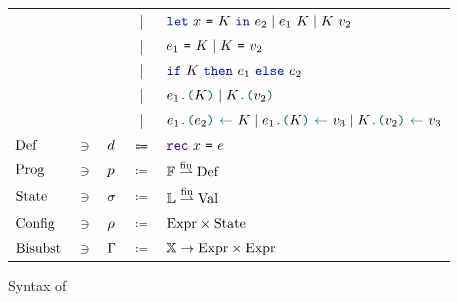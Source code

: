 \begin{figure}[tp]
\begin{tabular}{lclcl}
            &&
            & | &
            $\datalangLet{\datalangVar}{\datalangEctx}{\datalangExpr_2} \mid \datalangCall{\datalangExpr_1}{\datalangEctx} \mid \datalangCall{\datalangEctx}{\datalangVal_2}$
        \\
            &&
            & | &
            $\datalangEq{\datalangExpr_1}{\datalangEctx} \mid \datalangEq{\datalangEctx}{\datalangVal_2}$
        \\
            &&
            & | &
            $\datalangIf{\datalangEctx}{\datalangExpr_1}{\datalangExpr_2}$
        \\
            &&
            & | &
            $\datalangLoad{\datalangExpr_1}{\datalangEctx} \mid \datalangLoad{\datalangEctx}{\datalangVal_2}$
        \\
            &&
            & | &
            $\datalangStore{\datalangExpr_1}{\datalangExpr_2}{K} \mid \datalangStore{\datalangExpr_1}{\datalangEctx}{\datalangVal_3} \mid \datalangStore{\datalangEctx}{\datalangVal_2}{\datalangVal_3}$
        \\
            $\datalangDef[]$
            & $\ni$ &
            $\datalangDef$
            & $\Coloneqq$ &
            $\datalangRec{\datalangVar}{\datalangExpr}$
        \\
            $\datalangProg[]$
            & $\ni$ &
            $\datalangProg$
            & $\coloneqq$ &
            $\datalangFn[] \finmap \datalangDef[]$
        \\
            $\datalangState[]$
            & $\ni$ &
            $\datalangState$    
            & $\coloneqq$ &
            $\datalangLoc[] \finmap \datalangVal[]$
        \\
            $\datalangConfig[]$
            & $\ni$ &
            $\datalangConfig$
            & $\coloneqq$ &
            $\datalangExpr[] \times \datalangState[]$
        \\
            $\datalangBisubst[]$
            & $\ni$ &
            $\datalangBisubst$
            & $\coloneqq$ &
            $\datalangVar[] \rightarrow \datalangExpr[] \times \datalangExpr[]$
    \end{tabular}
    \caption{Syntax of \DataLang}
    \label{fig:syntax}
\end{figure}